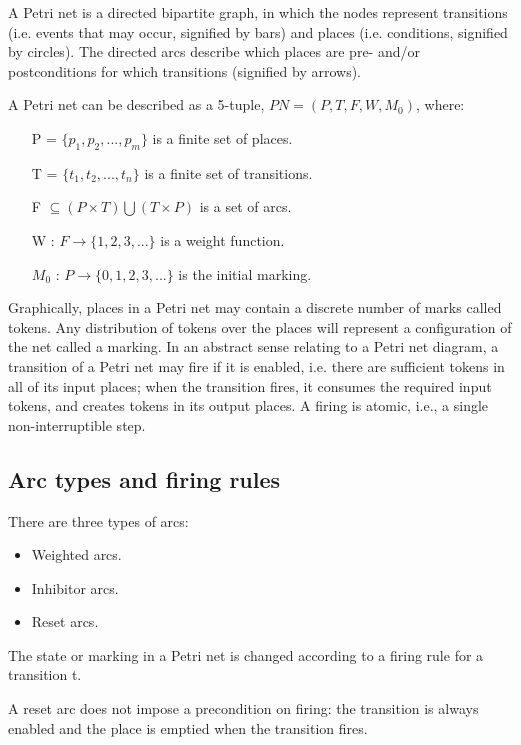 \documentclass[a4paper]{article}
\begin{document}
A Petri net is a directed bipartite graph, in which the nodes represent transitions (i.e. events that may occur, signified by bars) and places (i.e. conditions, signified by circles). The directed arcs describe which places are pre- and/or postconditions for which transitions (signified by arrows).

A Petri net can be described as a 5-tuple, $PN = (P, T, F, W, M_0)$, where: 

\begin{itemize}
	\item [P] = $\{p_1, p_2, ..., p_m\}$ is a finite set of places.
    \item [T] = $\{t_1, t_2, ..., t_n\}$ is a finite set of transitions.
    \item [F] $\subseteq (P \times T) \bigcup (T \times P)$ is a set of arcs.
    \item [W]: $F \rightarrow \{1, 2, 3, ...\}$ is a weight function.
    \item [$M_0$]: $P \rightarrow \{0, 1, 2, 3, ...\}$ is the initial marking.
\end{itemize}

Graphically, places in a Petri net may contain a discrete number of marks called tokens. Any distribution of tokens over the places will represent a configuration of the net called a marking. In an abstract sense relating to a Petri net diagram, a transition of a Petri net may fire if it is enabled, i.e. there are sufficient tokens in all of its input places; when the transition fires, it consumes the required input tokens, and creates tokens in its output places. A firing is atomic, i.e., a single non-interruptible step.

\subsection{Arc types and firing rules}

There are three types of arcs:

\begin{itemize}
	\item Weighted arcs.
    \item Inhibitor arcs.
    \item Reset arcs.
\end{itemize}

The state or marking in a Petri net is changed according to a firing rule for a transition t.

A reset arc does not impose a precondition on firing: the transition is always enabled and the place is emptied when the transition fires.
\end{document}
